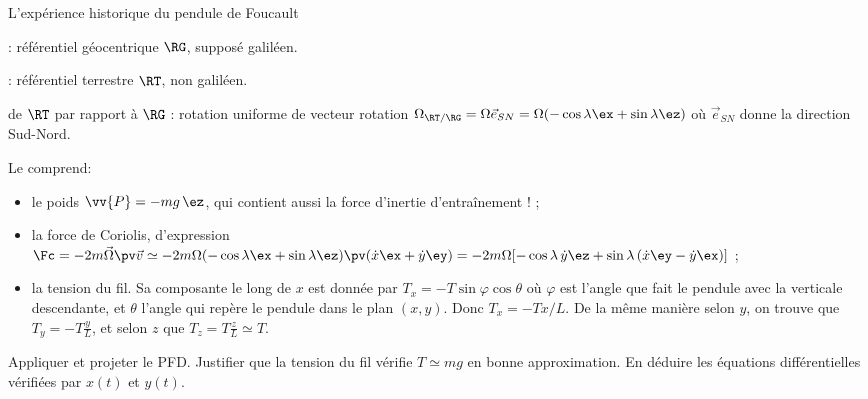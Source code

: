 \begin{exo}[PC][3][devoir]{L'expérience historique du pendule de Foucault}
\begin{quest}
{\begin{liste}
  \item {} : référentiel géocentrique $\RG$, supposé galiléen.
  \item {} : référentiel terrestre $\RT$, non galiléen.
  \item {} de $\RT$ par rapport à $\RG$ : rotation uniforme de vecteur rotation $\Omega_{\RT/\RG} = \Omega \Vec{e}_{SN} = \Omega(-\cos \lambda \ex + \sin \lambda \ez)$ où $\Vec{e}_{SN}$ donne la direction Sud-Nord.
  \item Le  comprend:
  \begin{itemize}
  \item le poids $\vv{P}=-mg\,\ez$, qui contient aussi la force d'inertie d'entraînement ! ;
  \item la force de Coriolis, d'expression $\Fc = -2m\Vec{\Omega} \pv \Vec{v} \simeq -2m\Omega(-\cos \lambda \ex + \sin \lambda \ez) \pv (\dot{x}\ex + \dot{y}\ey) = -2m\Omega[-\cos\lambda\,\dot{y} \ez + \sin\lambda\,(\dot{x}\ey-\dot{y}\ex)]$ ;
  \item la tension du fil. Sa composante le long de $x$ est donnée par $T_x=-T\sin\varphi \cos\theta$ où $\varphi$ est l'angle que fait le pendule avec la verticale descendante, et $\theta$ l'angle qui repère le pendule dans le plan $(x,y)$. Donc $T_x=-Tx/L$. De la même manière selon $y$, on trouve que $T_y=-T\frac{y}{L}$, et selon $z$ que $T_z=T\frac{z}{L}\simeq T$.
  \end{itemize}
\end{liste}




}

\item Appliquer et projeter le PFD. Justifier que la tension du fil vérifie $T \simeq mg$ en bonne approximation. En déduire les équations différentielles vérifiées par $x(t)$ et $y(t)$.



\end{quest}
\end{exo}
